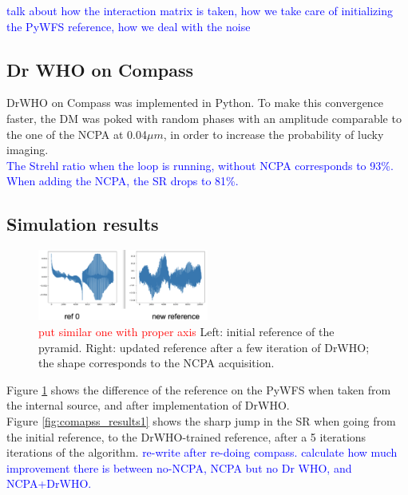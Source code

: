 \documentclass[twocolumn]{aastex62}
\begin{document}
\textcolor{blue}{talk about how the interaction matrix is taken, how we take care of initializing the PyWFS reference, how we deal with the noise}
 
 


 

\subsection{Dr WHO on Compass}

DrWHO on Compass was implemented in Python. To make this convergence faster, the DM was poked with random phases with an amplitude comparable to the one of the NCPA at 0.04$\mu m$, in order to increase the probability of lucky imaging. \\
\textcolor{blue}{The Strehl ratio when the loop is running, without NCPA corresponds to 93\%. When adding the NCPA, the SR drops to 81\%. }


\subsection{Simulation results}



\begin{figure}[ht!]
\begin{center}
\includegraphics[width=0.5\textwidth]{fig/compass_ref.png}
\caption{\textcolor{red}{put similar one with proper axis} Left: initial reference of the pyramid. Right: updated reference after a few iteration of DrWHO; the shape corresponds to the NCPA acquisition. }
\label{fig:refpyramide}
\end{center}
\end{figure}

Figure \ref{fig:refpyramide} shows the difference of the reference on the PyWFS when taken from the internal source, and after implementation of DrWHO. \\

Figure \ref{fig:comapss_results1} shows the sharp jump in the SR when going from the initial reference, to the DrWHO-trained reference, after a 5 iterations iterations of the algorithm. \textcolor{blue}{re-write after re-doing compass. calculate how much improvement there is between no-NCPA, NCPA but no Dr WHO, and NCPA+DrWHO.}
\end{document}
